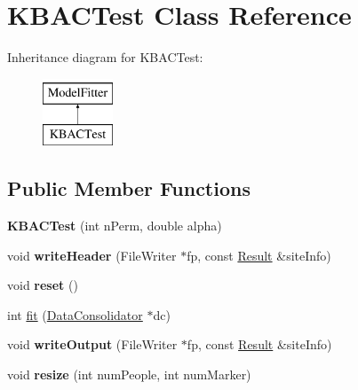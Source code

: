 \hypertarget{classKBACTest}{\section{K\-B\-A\-C\-Test Class Reference}
\label{classKBACTest}
}
Inheritance diagram for K\-B\-A\-C\-Test\-:\begin{figure}[H]
\begin{center}
\leavevmode
\includegraphics[height=2.000000cm]{classKBACTest}
\end{center}
\end{figure}
\subsection*{Public Member Functions}
\begin{DoxyCompactItemize}
\item 
\hypertarget{classKBACTest_a04db2b0a7c782d8c4a4e94f868fc2217}{{\bfseries K\-B\-A\-C\-Test} (int n\-Perm, double alpha)}\label{classKBACTest_a04db2b0a7c782d8c4a4e94f868fc2217}

\item 
\hypertarget{classKBACTest_a54a09e6a6bb1779ce7f1fcb49e7a2f2a}{void {\bfseries write\-Header} (File\-Writer $\ast$fp, const \hyperlink{classResult}{Result} \&site\-Info)}\label{classKBACTest_a54a09e6a6bb1779ce7f1fcb49e7a2f2a}

\item 
\hypertarget{classKBACTest_a975e1bf8ac13212efe9387e88bd19c63}{void {\bfseries reset} ()}\label{classKBACTest_a975e1bf8ac13212efe9387e88bd19c63}

\item 
int \hyperlink{classKBACTest_a4ebdf07477d26041b92ef5a63f4e1237}{fit} (\hyperlink{classDataConsolidator}{Data\-Consolidator} $\ast$dc)
\item 
\hypertarget{classKBACTest_a3836fbb6d6793ccb46a8e2037708b842}{void {\bfseries write\-Output} (File\-Writer $\ast$fp, const \hyperlink{classResult}{Result} \&site\-Info)}\label{classKBACTest_a3836fbb6d6793ccb46a8e2037708b842}

\item 
\hypertarget{classKBACTest_acf816107e17310c26f8e2720368292f5}{void {\bfseries resize} (int num\-People, int num\-Marker)}\label{classKBACTest_acf816107e17310c26f8e2720368292f5}

\end{DoxyCompactItemize}
